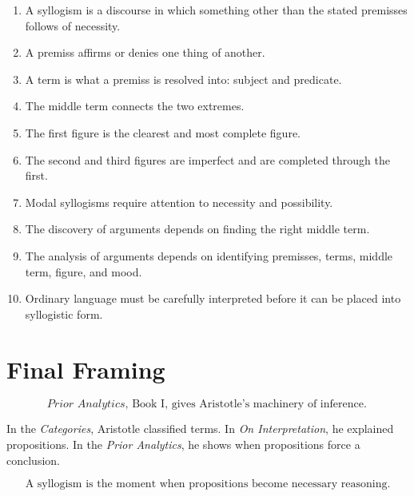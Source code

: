 \documentclass[12pt]{article}
\begin{document}
\begin{enumerate}[itemsep=0.5em]
    \item A syllogism is a discourse in which something other than the stated
    premisses follows of necessity.

    \item A premiss affirms or denies one thing of another.

    \item A term is what a premiss is resolved into: subject and predicate.

    \item The middle term connects the two extremes.

    \item The first figure is the clearest and most complete figure.

    \item The second and third figures are imperfect and are completed through
    the first.

    \item Modal syllogisms require attention to necessity and possibility.

    \item The discovery of arguments depends on finding the right middle term.

    \item The analysis of arguments depends on identifying premisses, terms,
    middle term, figure, and mood.

    \item Ordinary language must be carefully interpreted before it can be
    placed into syllogistic form.
\end{enumerate}

\section*{Final Framing}

\[
\boxed{
\textit{Prior Analytics}, \text{ Book I, gives Aristotle's machinery of inference.}
}
\]

In the \textit{Categories}, Aristotle classified terms. In
\textit{On Interpretation}, he explained propositions. In the
\textit{Prior Analytics}, he shows when propositions force a conclusion.

\[
\boxed{
\text{A syllogism is the moment when propositions become necessary reasoning.}
}
\]
\end{document}
